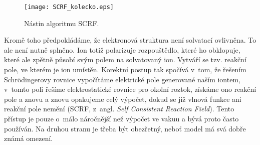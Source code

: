 \begin{itemize}
\begin{figure} [H]
\centering
\texttt{[image: SCRF\_kolecko.eps]}
\caption{Nástin algoritmu SCRF.}
\label{SCRF}
\end{figure}

\noindent Kromě toho předpokládáme, že elektronová struktura není solvatací ovlivněna. To ale není nutně splněno. Ion totiž polarizuje rozpouštědlo, které ho obklopuje, které ale zpětně působí svým polem na solvatovaný ion. Vytváří se tzv. reakční pole, ve kterém je ion umístěn. Korektní postup tak spočívá v~tom, že řešením Schr\"odingerovy rovnice vypočítáme elektrické pole generované naším iontem, v~tomto poli řešíme elektrostatické rovnice pro okolní roztok, získáme ono reakční pole a znovu a znovu opakujeme celý výpočet, dokud se již vlnová funkce ani reakční pole nemění (SCRF, z~angl. \textit{Self Consistent Reaction Field}). Tento přístup je pouze o~málo náročnější než výpočet ve vakuu a bývá proto často používán. Na druhou stranu je třeba být obezřetný, neboť model má svá dobře známá omezení.        

     


\end{itemize}